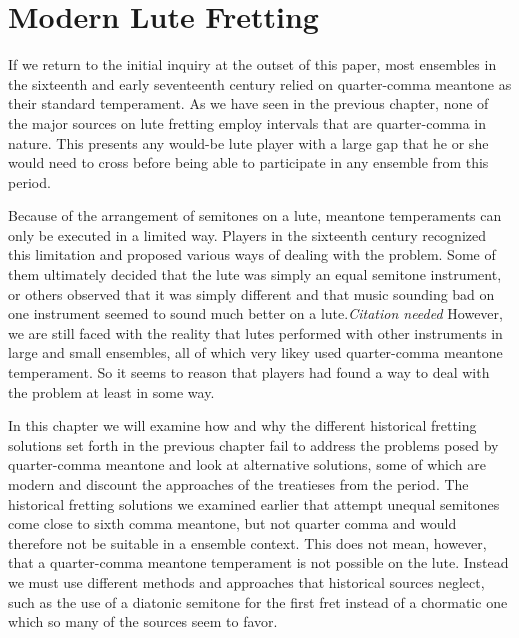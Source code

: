 %
%
%
%
%
%
%

\chapter{Modern Lute Fretting}

If we return to the initial inquiry at the outset of this paper, most ensembles in the sixteenth
and early seventeenth century relied on quarter-comma meantone as their standard temperament.
As we have seen in the previous chapter, none of the major sources on lute fretting employ
intervals that are quarter-comma in nature.  This presents any would-be lute player with a
large gap that he or she would need to cross before being able to participate in any ensemble
from this period.

Because of the arrangement of semitones on a lute, meantone temperaments can only
be executed in a limited way.  Players in the sixteenth century recognized this limitation and
proposed various ways of dealing with the problem.  Some of them ultimately decided that the lute
was simply an equal semitone instrument, or others observed that it was simply different and that
music sounding bad on one instrument seemed to sound much better on a lute.\textit{Citation needed}
However, we are still
faced with the reality that lutes performed with other instruments in
large and small ensembles, all of which very likey used quarter-comma meantone temperament.  So
it seems to reason that players had found a way to deal with the problem at least in some way.

In this chapter we will examine how and why the different historical fretting solutions
set forth in the previous chapter fail to address the problems posed by quarter-comma
meantone and look at alternative solutions, some of which are modern and discount the approaches
of the treatieses from the period. The historical fretting solutions we examined earlier that
attempt unequal semitones come close to sixth comma meantone, but not quarter comma and would
therefore not be suitable in a ensemble context.  This does not mean, however, that a quarter-comma
meantone temperament is not possible on the lute.  Instead we must use
different methods and approaches that historical sources neglect, such as the use of
a diatonic semitone for the first fret instead of a chormatic one which so many of the sources
seem to favor.

